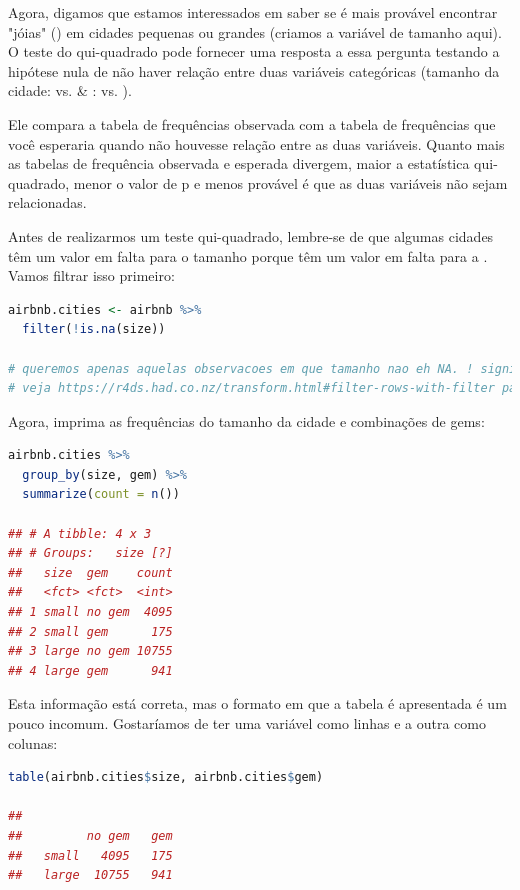 \documentclass{article}
\begin{document}
Agora, digamos que estamos interessados em saber se é mais provável encontrar "jóias" () em cidades pequenas ou grandes (criamos a variável de tamanho aqui). O teste do qui-quadrado pode fornecer uma resposta a essa pergunta testando a hipótese nula de não haver relação entre duas variáveis categóricas (tamanho da cidade:   vs.  & :  vs. ). 

Ele compara a tabela de frequências observada com a tabela de frequências que você esperaria quando não houvesse relação entre as duas variáveis. Quanto mais as tabelas de frequência observada e esperada divergem, maior a estatística qui-quadrado, menor o valor de p e menos provável é que as duas variáveis não sejam relacionadas.

Antes de realizarmos um teste qui-quadrado, lembre-se de que algumas cidades têm um valor em falta para o tamanho porque têm um valor em falta para a . Vamos filtrar isso primeiro:

\begin{lstlisting}[language=R]
airbnb.cities <- airbnb %>% 
  filter(!is.na(size)) 

# queremos apenas aquelas observacoes em que tamanho nao eh NA. ! significa 'nao'
# veja https://r4ds.had.co.nz/transform.html#filter-rows-with-filter para mais funcoes logicas (desca ate a secao 5.2.2)
\end{lstlisting}

Agora, imprima as frequências do tamanho da cidade e combinações de gems:

\begin{lstlisting}[language=R]
airbnb.cities %>% 
  group_by(size, gem) %>% 
  summarize(count = n())
  
## # A tibble: 4 x 3
## # Groups:   size [?]
##   size  gem    count
##   <fct> <fct>  <int>
## 1 small no gem  4095
## 2 small gem      175
## 3 large no gem 10755
## 4 large gem      941
\end{lstlisting}

Esta informação está correta, mas o formato em que a tabela é apresentada é um pouco incomum. Gostaríamos de ter uma variável como linhas e a outra como colunas:

\begin{lstlisting}[language=R]
table(airbnb.cities$size, airbnb.cities$gem)

##        
##         no gem   gem
##   small   4095   175
##   large  10755   941
\end{lstlisting}
\end{document}
